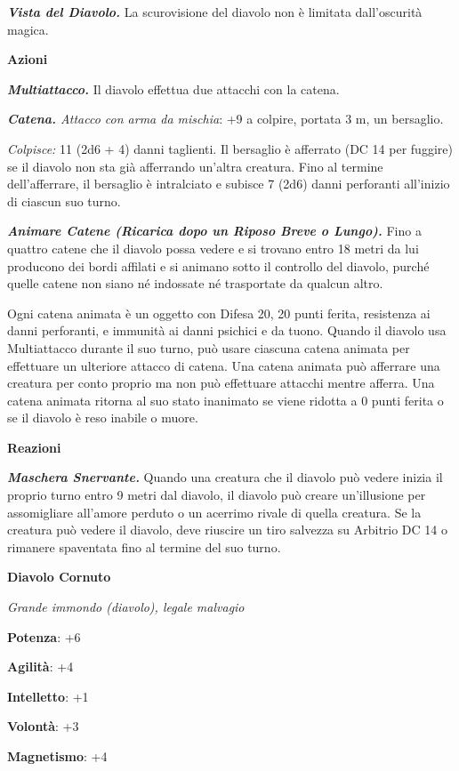 \begin{multicols}{2}
\emph{\textbf{Vista del Diavolo.}} La scurovisione del diavolo non è
limitata dall'oscurità magica.

\textbf{Azioni}

\emph{\textbf{Multiattacco.}} Il diavolo effettua due attacchi con la
catena.

\emph{\textbf{Catena.} Attacco con arma da mischia}: +9 a colpire,
portata 3 m, un bersaglio.

\emph{Colpisce:} 11 (2d6 + 4) danni taglienti. Il bersaglio è afferrato
(DC 14 per fuggire) se il diavolo non sta già afferrando un'altra
creatura. Fino al termine dell'afferrare, il bersaglio è intralciato e
subisce 7 (2d6) danni perforanti all'inizio di ciascun suo turno.

\emph{\textbf{Animare Catene (Ricarica dopo un Riposo Breve o Lungo).}}
Fino a quattro catene che il diavolo possa vedere e si trovano entro 18
metri da lui producono dei bordi affilati e si animano sotto il
controllo del diavolo, purché quelle catene non siano né indossate né
trasportate da qualcun altro.

Ogni catena animata è un oggetto con Difesa 20, 20 punti ferita, resistenza
ai danni perforanti, e immunità ai danni psichici e da tuono. Quando il
diavolo usa Multiattacco durante il suo turno, può usare ciascuna catena
animata per effettuare un ulteriore attacco di catena. Una catena
animata può afferrare una creatura per conto proprio ma non può
effettuare attacchi mentre afferra. Una catena animata ritorna al suo
stato inanimato se viene ridotta a 0 punti ferita o se il diavolo è reso
inabile o muore.

\textbf{Reazioni}

\emph{\textbf{Maschera Snervante.}} Quando una creatura che il diavolo
può vedere inizia il proprio turno entro 9 metri dal diavolo, il diavolo
può creare un'illusione per assomigliare all'amore perduto o un acerrimo
rivale di quella creatura. Se la creatura può vedere il diavolo, deve
riuscire un tiro salvezza su Arbitrio DC 14 o rimanere spaventata fino
al termine del suo turno.

\textbf{Diavolo Cornuto}

\emph{Grande immondo (diavolo), legale malvagio}

\textbf{Potenza}: +6

\textbf{Agilità}: +4

\textbf{Intelletto}: +1

\textbf{Volontà}: +3

\textbf{Magnetismo}: +4


\end{multicols}
